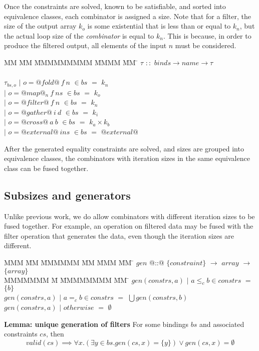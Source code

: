 Once the constraints are solved, known to be satisfiable, and sorted into equivalence classes, each combinator is assigned a size.
Note that for a filter, the size of the output array $k_o$ is some existential that is less than or equal to $k_n$, but the actual loop size of the \emph{combinator} is equal to $k_n$.
This is because, in order to produce the filtered output, all elements of the input $n$ must be considered.


\begin{tabbing}
MM \= MM \= MMMMMMMMM \= MMMM \= MM \= \kill
$\tau$  \>$::$\> $binds \rightarrow name \rightarrow \tau$ \\
\\
$\tau_{bs,o}$    
            \> $|$ \> $o = @fold@~f~n$      \> $\in bs$ \> $=$ \> $k_n$ \\
            \> $|$ \> $o = @map@_n~f~ns$    \> $\in bs$ \> $=$ \> $k_o$ \\
            \> $|$ \> $o = @filter@~f~n$    \> $\in bs$ \> $=$ \> $k_n$ \\
            \> $|$ \> $o = @gather@~i~d$    \> $\in bs$ \> $=$ \> $k_i$ \\
            \> $|$ \> $o = @cross@~a~b$     \> $\in bs$ \> $=$ \> $k_a \times k_b$ \\
            \> $|$ \> $o = @external@~ins$  \> $\in bs$ \> $=$ \> $@external@$ \\
\end{tabbing}

After the generated equality constraints are solved, and sizes are grouped into equivalence classes, the combinators with iteration sizes in the same equivalence class can be fused together.

\subsection{Subsizes and generators}
Unlike previous work, we do allow combinators with different iteration sizes to be fused together.
For example, an operation on filtered data may be fused with the filter operation that generates the data, even though the iteration sizes are different.



\begin{tabbing}
MMM       \= MM \= MMMMMM \= MM \= MMM \= MM \= \kill
$gen$   \> @::@  \> $\{constraint\}$  \> $\to$ \> $array$ \> $\to$ \> $\{array\}$ \\
MMMMMMM                 \= M  \= MMMMMMMM \= MM \= \kill
$gen(constrs, a)$ \> $|$ \> $a \le_c b \in constrs$ \> $=$ \> $\{b\}$                        \\
$gen(constrs, a)$ \> $|$ \> $a =_c b \in constrs$   \> $=$ \> $\bigcup gen(constrs, b)$                        \\
$gen(constrs, a)$ \> $|$ \> $otherwise$             \> $=$ \> $\emptyset$                        \\
\end{tabbing}

\textbf{Lemma: unique generation of filters}
For some bindings $bs$ and associated constraints $cs$, then
\[
valid(cs) \implies \forall x. (\exists y \in bs. gen(cs, x) = \{y\}) \vee gen(cs, x) = \emptyset
\]

